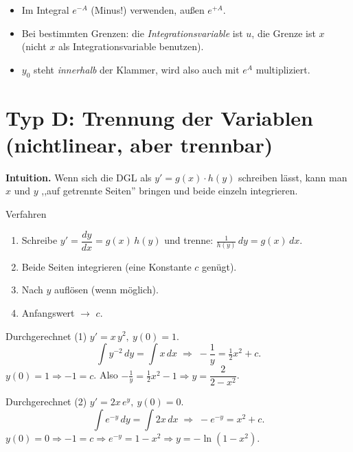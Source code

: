 \documentclass[a4paper,11pt]{article}
\begin{document}
\begin{fehlerbox}
\begin{itemize}[leftmargin=1.4em,itemsep=2pt]
  \item Im Integral $e^{-A}$ (Minus!) verwenden, außen $e^{+A}$.
  \item Bei bestimmten Grenzen: die \emph{Integrationsvariable} ist $u$, die Grenze ist $x$
        (nicht $x$ als Integrationsvariable benutzen).
  \item $y_0$ steht \emph{innerhalb} der Klammer, wird also auch mit $e^{A}$ multipliziert.
\end{itemize}
\end{fehlerbox}

\section{Typ D: Trennung der Variablen (nichtlinear, aber trennbar)}

\textbf{Intuition.} Wenn sich die DGL als $y'=g(x)\cdot h(y)$ schreiben lässt, kann man $x$
und $y$ ,,auf getrennte Seiten'' bringen und beide einzeln integrieren.

\begin{satzbox}{Verfahren}
\begin{enumerate}[leftmargin=1.6em,itemsep=2pt]
  \item Schreibe $y'=\dfrac{dy}{dx}=g(x)\,h(y)$ und trenne:
        $\displaystyle \frac{1}{h(y)}\,dy=g(x)\,dx$.
  \item Beide Seiten integrieren (eine Konstante $c$ genügt).
  \item Nach $y$ auflösen (wenn möglich).
  \item Anfangswert $\to$ $c$.
\end{enumerate}
\end{satzbox}

\begin{bspbox}{Durchgerechnet (1)}
$y'=x\,y^2,\ y(0)=1$.
\[
  \int y^{-2}\,dy=\int x\,dx \;\Rightarrow\; -\frac1y=\tfrac12x^2+c.
\]
$y(0)=1\Rightarrow -1=c$. Also $-\tfrac1y=\tfrac12x^2-1 \Rightarrow y=\dfrac{2}{2-x^2}$.
\end{bspbox}

\begin{bspbox}{Durchgerechnet (2)}
$y'=2x\,e^{y},\ y(0)=0$.
\[
  \int e^{-y}\,dy=\int 2x\,dx \;\Rightarrow\; -e^{-y}=x^2+c.
\]
$y(0)=0\Rightarrow -1=c \Rightarrow e^{-y}=1-x^2 \Rightarrow y=-\ln(1-x^2)$.
\end{bspbox}
\end{document}
